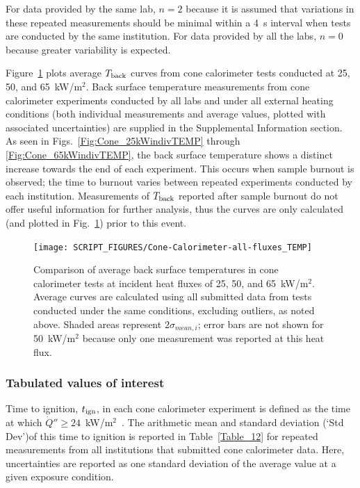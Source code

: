 \documentclass{book}
\begin{document}
For data provided by the same lab, $n=2$ because it is assumed that variations in these repeated measurements should be minimal within a 4~s interval when tests are conducted by the same institution. For data provided by all the labs, $n=0$ because greater variability is expected.

Figure~\ref{Fig:Cone-Calorimeter-all-fluxes_TEMP} plots average $T_{\rm back}$ curves from cone calorimeter tests conducted at 25, 50, and 65~kW/m$^2$. Back surface temperature measurements from cone calorimeter experiments conducted by all labs and under all external heating conditions (both individual measurements and average values, plotted with associated uncertainties) are supplied in the Supplemental Information section. As seen in Figs.~\ref{Fig:Cone_25kWindivTEMP} through \ref{Fig:Cone_65kWindivTEMP}, the back surface temperature shows a distinct increase towards the end of each experiment. This occurs when sample burnout is observed; the time to burnout varies between repeated experiments conducted by each institution. Measurements of $T_{\rm back}$ reported after sample burnout do not offer useful information for further analysis, thus the curves are only calculated (and plotted in Fig.~\ref{Fig:Cone-Calorimeter-all-fluxes_TEMP}) prior to this event.

\newpage
\begin{figure}
  \centering
  \texttt{[image: SCRIPT\_FIGURES/Cone-Calorimeter-all-fluxes\_TEMP]}
  \caption{Comparison of average back surface temperatures in cone calorimeter tests at incident heat fluxes of 25, 50, and 65~kW/m$^2$. Average curves are calculated using all submitted data from tests conducted under the same conditions, excluding outliers, as noted above. Shaded areas represent $2\sigma_{mean,i}$; error bars are not shown for 50~kW/m$^2$ because only one measurement was reported at this heat flux.}
  \label{Fig:Cone-Calorimeter-all-fluxes_TEMP}
\end{figure}


\subsubsection{Tabulated values of interest}

Time to ignition, $t_{\rm ign}$, in each cone calorimeter experiment is defined as the time at which $\dot{Q}'' \ge 24$~kW/m$^2$~\cite{lyon2007criteria}. The arithmetic mean and standard deviation (`Std Dev')of this time to ignition is reported in Table~\ref{Table_12} for repeated measurements from all institutions that submitted cone calorimeter data. Here, uncertainties are reported as one standard deviation of the average value at a given exposure condition.
\end{document}
